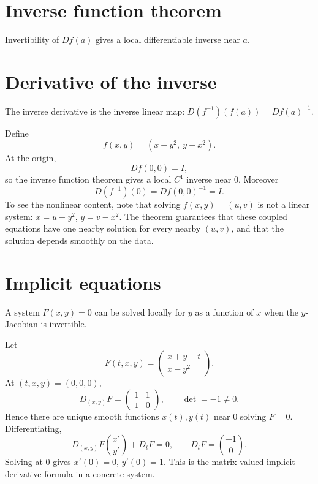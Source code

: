 \section{Inverse function theorem}
Invertibility of $Df(a)$ gives a local differentiable inverse near $a$.

\section{Derivative of the inverse}
The inverse derivative is the inverse linear map: $D(f^{-1})(f(a))=Df(a)^{-1}$.


\begin{example}\label{ex:ii09-expand-01}
Define
\[
f(x,y)=(x+y^2,\ y+x^2).
\]
At the origin,
\[
Df(0,0)=I,
\]
so the inverse function theorem gives a local \(C^1\) inverse near \(0\).
Moreover
\[
D(f^{-1})(0)=Df(0,0)^{-1}=I.
\]
To see the nonlinear content, note that solving \(f(x,y)=(u,v)\) is not a
linear system: \(x=u-y^2\), \(y=v-x^2\). The theorem guarantees that these
coupled equations have one nearby solution for every nearby \((u,v)\), and
that the solution depends smoothly on the data.
\end{example}
\section{Implicit equations}
A system $F(x,y)=0$ can be solved locally for $y$ as a function of $x$ when the $y$-Jacobian is invertible.


\begin{example}\label{ex:ii09-expand-02}
Let
\[
F(t,x,y)=
\begin{pmatrix}
x+y-t\\
x-y^2
\end{pmatrix}.
\]
At \((t,x,y)=(0,0,0)\),
\[
D_{(x,y)}F=
\begin{pmatrix}
1&1\\
1&0
\end{pmatrix},
\qquad \det=-1\ne0.
\]
Hence there are unique smooth functions \(x(t),y(t)\) near \(0\) solving
\(F=0\). Differentiating,
\[
D_{(x,y)}F\binom{x'}{y'}+
D_tF=0,\qquad D_tF=\binom{-1}{0}.
\]
Solving at \(0\) gives \(x'(0)=0\), \(y'(0)=1\). This is the matrix-valued
implicit derivative formula in a concrete system.
\end{example}
